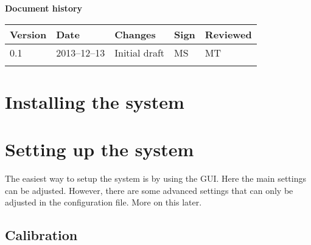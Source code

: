 \documentclass[10pt, a4paper, twoside]{article}
\numberwithin{equation}{subsection}
\numberwithin{figure}{section}
\numberwithin{table}{section}
\begin{document}



\newpage
\pagestyle{fancy}
\setcounter{page}{2} %




\newpage
\tableofcontents
\listoffigures
\listoftables



\newpage
\vspace*{5\baselineskip}

\begin{center}
\textbf{\LARGE Document history}

{ \footnotesize 
\begin{tabular}{|p{1cm}|p{2.0cm}|p{5cm}|p{1.5cm}|p{2cm}|}
	\hline

	\textbf{Version} & \textbf{Date} & \textbf{Changes} & \textbf{Sign} & \textbf{Reviewed} \\
	
	\hline
	0.1 & 2013--12--13 & Initial draft & MS & MT\\
	
	\hline
	 &  &  &  &  \\
	
	\hline
\end{tabular}
}
\end{center}





%
%
\newpage
{}

\newpage
\section{Installing the system}
\label{sec:installation}

\newpage

\section{Setting up the system}
The easiest way to setup the system is by using the GUI. Here the main settings can be adjusted. However, there are some advanced settings that can only be adjusted in the configuration file. More on this later. 

\subsection{Calibration}
\label{sec:setup}

\newpage
\end{document}
